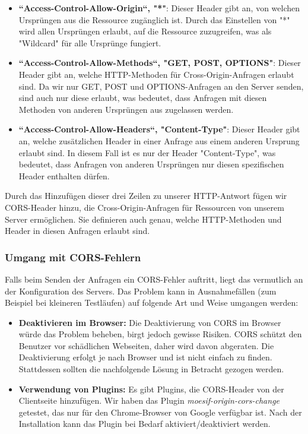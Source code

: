 \begin{itemize}
\begin{itemize}
    \item \textbf{``Access-Control-Allow-Origin``, "*"}: Dieser Header gibt an, von welchen Ursprüngen aus die Ressource zugänglich ist. Durch das Einstellen von "*" wird allen Ursprüngen erlaubt, auf die Ressource zuzugreifen, was als "Wildcard" für alle Ursprünge fungiert.
    \item \textbf{``Access-Control-Allow-Methods``, "GET, POST, OPTIONS"}: Dieser Header gibt an, welche HTTP-Methoden für Cross-Origin-Anfragen erlaubt sind. Da wir nur GET, POST und OPTIONS-Anfragen an den Server senden, sind auch nur diese erlaubt, was bedeutet, dass Anfragen mit diesen Methoden von anderen Ursprüngen aus zugelassen werden.
    \item \textbf{``Access-Control-Allow-Headers``, "Content-Type"}: Dieser Header gibt an, welche zusätzlichen Header in einer Anfrage aus einem anderen Ursprung erlaubt sind. In diesem Fall ist es nur der Header "Content-Type", was bedeutet, dass Anfragen von anderen Ursprüngen nur diesen spezifischen Header enthalten dürfen.
\end{itemize}

Durch das Hinzufügen dieser drei Zeilen zu unserer HTTP-Antwort fügen wir CORS-Header hinzu, die Cross-Origin-Anfragen für Ressourcen von unserem Server ermöglichen. Sie definieren auch genau, welche HTTP-Methoden und Header in diesen Anfragen erlaubt sind.

\subsubsection*{Umgang mit CORS-Fehlern}
Falls beim Senden der Anfragen ein CORS-Fehler auftritt, liegt das vermutlich an der Konfiguration des Servers. Das Problem kann in Ausnahmefällen (zum Beispiel bei kleineren Testläufen) auf folgende Art und Weise umgangen werden:

\begin{itemize}
    \item \textbf{Deaktivieren im Browser:} Die Deaktivierung von CORS im Browser würde das Problem beheben, birgt jedoch gewisse Risiken. CORS schützt den Benutzer vor schädlichen Webseiten, daher wird davon abgeraten. Die Deaktivierung erfolgt je nach Browser und ist nicht einfach zu finden. Stattdessen sollten die nachfolgende Lösung in Betracht gezogen werden.
    \item \textbf{Verwendung von Plugins:} Es gibt Plugins, die CORS-Header von der Clientseite hinzufügen. Wir haben das Plugin \textit{moesif-origin-cors-change} getestet, das nur für den Chrome-Browser von Google verfügbar ist. Nach der Installation kann das Plugin bei Bedarf aktiviert/deaktiviert werden.
\end{itemize}


\end{itemize}
